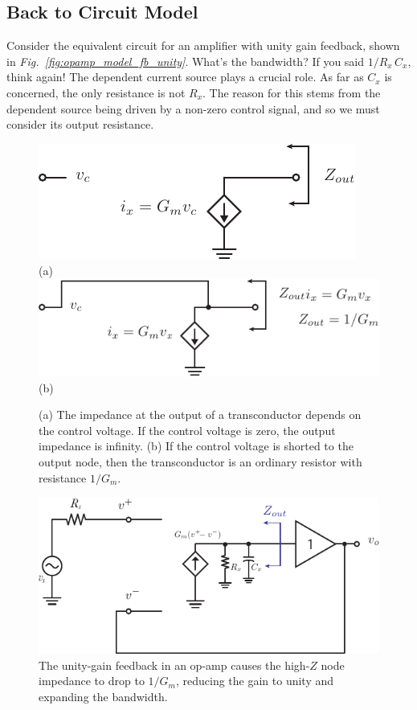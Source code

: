 \subsection{Back to Circuit Model}
Consider the equivalent circuit for an amplifier with unity gain feedback, shown in \emph{Fig.~\ref{fig:opamp_model_fb_unity}}.  What's the bandwidth?  If you said $1/R_x\,C_x$, think again!  The dependent current source plays a crucial role.  As far as $C_x$ is concerned, the only resistance is not $R_x$.  The reason for this stems from the dependent source being driven by a non-zero control signal, and so we must consider its output resistance.
\begin{figure}[H]
\centering
\includegraphics[width=.7\columnwidth]{tia_zout}\\
(a)\\[0.5cm]
\includegraphics[width=.7\columnwidth]{tia_zout_fb}\\
(b)\\
\caption{(a) The impedance at the output of a transconductor depends on the control voltage. If the control voltage is zero, the output impedance is infinity.  (b) If the control voltage is shorted to the output node, then the transconductor is an ordinary resistor with resistance $1/G_m$.}
\label{fig:tia_zout}
\end{figure}
\newpage
\begin{figure}[t]
\centering
\includegraphics[scale=1.15]{opamp_model_fb_unity_label}
\caption{The unity-gain feedback in an op-amp causes the high-$Z$ node impedance to drop to $1/G_m$, reducing the gain to unity and expanding the bandwidth.}
\label{fig:opamp_model_fb_unity_label}
\end{figure}
